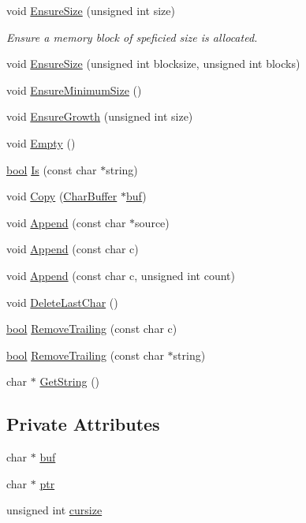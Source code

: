 \begin{DoxyCompactItemize}
void \hyperlink{classCharBuffer_ad1907009b5ad136692b989fa96bf2f7e}{Ensure\+Size} (unsigned int size)
\begin{DoxyCompactList}\small\item\em Ensure a memory block of speficied size is allocated. \end{DoxyCompactList}\item 
void \hyperlink{classCharBuffer_a91ce4f4083b9a29c48f75e2af4071f28}{Ensure\+Size} (unsigned int blocksize, unsigned int blocks)
\item 
void \hyperlink{classCharBuffer_ae742439a2d5d5a0ad64411dcbf4604c8}{Ensure\+Minimum\+Size} ()
\item 
void \hyperlink{classCharBuffer_a73c71d361110b37819a1d681a1504b0e}{Ensure\+Growth} (unsigned int size)
\item 
void \hyperlink{classCharBuffer_abe39d3fd7d8b9c8ec343af2cae7adc96}{Empty} ()
\item 
\hyperlink{platform_8h_a1062901a7428fdd9c7f180f5e01ea056}{bool} \hyperlink{classCharBuffer_a64988275bda43dddb6d2b3b9551cefb0}{Is} (const char $\ast$string)
\item 
void \hyperlink{classCharBuffer_a9f35562a39a7785e73f09fbd9f6938bf}{Copy} (\hyperlink{classCharBuffer}{Char\+Buffer} $\ast$\hyperlink{classCharBuffer_a8bcd8491b24db4197b311eb361609674}{buf})
\item 
void \hyperlink{classCharBuffer_a045b38735f7b3007c1b98d3d7b7feafe}{Append} (const char $\ast$source)
\item 
void \hyperlink{classCharBuffer_a1ba545a85907bbc9ab26cdc99b031440}{Append} (const char c)
\item 
void \hyperlink{classCharBuffer_af0db379281b7f3f8b4746344521999c1}{Append} (const char c, unsigned int count)
\item 
void \hyperlink{classCharBuffer_a8bc0eaf1a874ccf76c0034299f8459a7}{Delete\+Last\+Char} ()
\item 
\hyperlink{platform_8h_a1062901a7428fdd9c7f180f5e01ea056}{bool} \hyperlink{classCharBuffer_a1071772d1059263f4f880965fcc349ab}{Remove\+Trailing} (const char c)
\item 
\hyperlink{platform_8h_a1062901a7428fdd9c7f180f5e01ea056}{bool} \hyperlink{classCharBuffer_a45beaedff09c0c079075cfced78c8002}{Remove\+Trailing} (const char $\ast$string)
\item 
char $\ast$ \hyperlink{classCharBuffer_a7dfd3feaaf80f318ba44efe15b1ec44b}{Get\+String} ()
\end{DoxyCompactItemize}
\subsection*{Private Attributes}
\begin{DoxyCompactItemize}
\item 
char $\ast$ \hyperlink{classCharBuffer_a8bcd8491b24db4197b311eb361609674}{buf}
\item 
char $\ast$ \hyperlink{classCharBuffer_a2d313433650506fd6609e6947729dfb0}{ptr}
\item 
unsigned int \hyperlink{classCharBuffer_ac3265c68505802fbe8b590d5a423b0d0}{cursize}
\end{DoxyCompactItemize}
